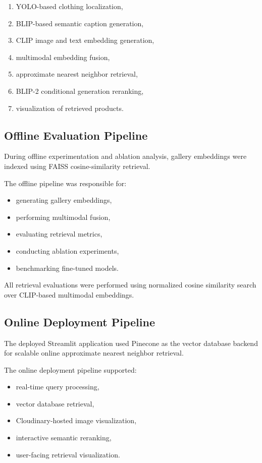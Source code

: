 \documentclass[11pt,a4paper]{article}
\begin{document}
\begin{enumerate}
    \item YOLO-based clothing localization,
    \item BLIP-based semantic caption generation,
    \item CLIP image and text embedding generation,
    \item multimodal embedding fusion,
    \item approximate nearest neighbor retrieval,
    \item BLIP-2 conditional generation reranking,
    \item visualization of retrieved products.
\end{enumerate}

\subsection{Offline Evaluation Pipeline}

During offline experimentation and ablation analysis, gallery embeddings were indexed using FAISS cosine-similarity retrieval.

The offline pipeline was responsible for:
\begin{itemize}
    \item generating gallery embeddings,
    \item performing multimodal fusion,
    \item evaluating retrieval metrics,
    \item conducting ablation experiments,
    \item benchmarking fine-tuned models.
\end{itemize}

All retrieval evaluations were performed using normalized cosine similarity search over CLIP-based multimodal embeddings.

\subsection{Online Deployment Pipeline}

The deployed Streamlit application used Pinecone as the vector database backend for scalable online approximate nearest neighbor retrieval.

The online deployment pipeline supported:
\begin{itemize}
    \item real-time query processing,
    \item vector database retrieval,
    \item Cloudinary-hosted image visualization,
    \item interactive semantic reranking,
    \item user-facing retrieval visualization.
\end{itemize}
\end{document}
